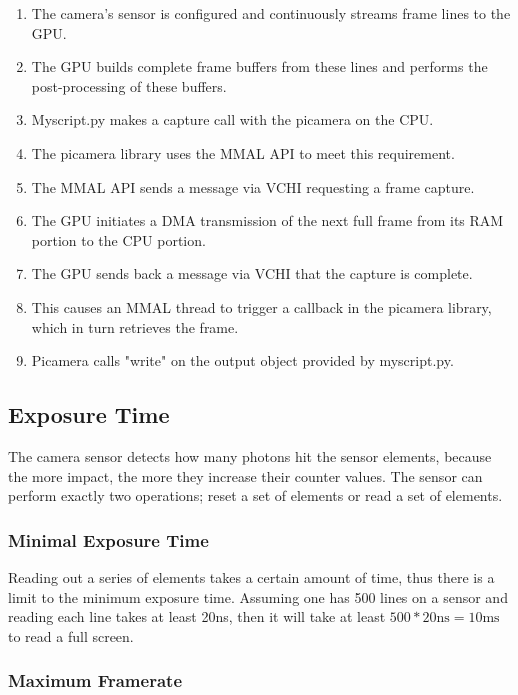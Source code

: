 \documentclass[12pt, a4paper]{report}
\begin{document}
    \begin{enumerate}
    \item The camera's sensor is configured and continuously streams frame lines to the GPU.
    \item The GPU builds complete frame buffers from these lines and performs the post-processing of these buffers.
    \item Myscript.py makes a capture call with the picamera on the CPU.
    \item The picamera library uses the MMAL API to meet this requirement.
    \item The MMAL API sends a message via VCHI requesting a frame capture.
    \item The GPU initiates a DMA transmission of the next full frame from its RAM portion to the CPU portion.
    \item The GPU sends back a message via VCHI that the capture is complete.
    \item This causes an MMAL thread to trigger a callback in the picamera library, which in turn retrieves the frame.
    \item Picamera calls "write" on the output object provided by myscript.py.
    \end{enumerate}
    
    \subsection{Exposure Time}
    
    The camera sensor detects how many photons hit the sensor elements, because the more impact, the more they increase their counter values. The sensor can perform exactly two operations; reset a set of elements or read a set of elements.
    
    \subsubsection{Minimal Exposure Time}
    
    Reading out a series of elements takes a certain amount of time, thus there is a limit to the minimum exposure time. Assuming one has 500 lines on a sensor and reading each line takes at least 20ns, then it will take at least $500*20 \text{ns} = 10 \text{ms}$ to read a full screen. 
    
    \subsubsection{Maximum Framerate}
    
\end{document}
